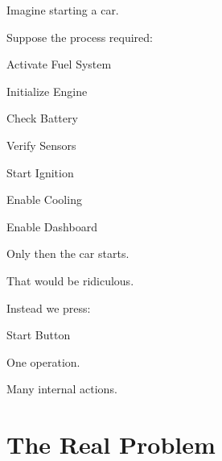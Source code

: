 \documentclass[11pt,a4paper]{book}
\begin{document}
Imagine starting a car.


Suppose the process required:


Activate Fuel System


Initialize Engine


Check Battery


Verify Sensors


Start Ignition


Enable Cooling


Enable Dashboard


Only then the car starts.


That would be ridiculous.


Instead we press:


Start Button


One operation.


Many internal actions.


\section{The Real Problem}
\end{document}
